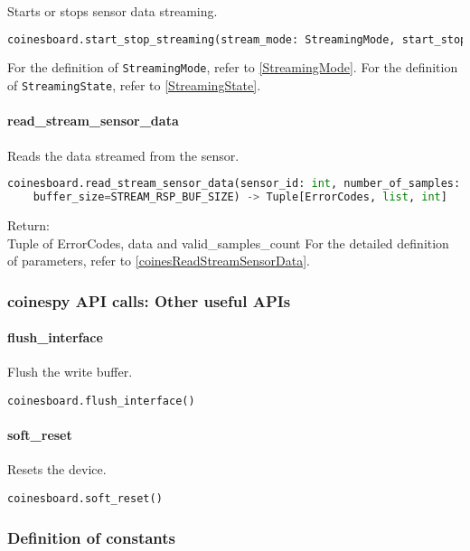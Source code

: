 Starts or stops sensor data streaming.

\begin{lstlisting}[language=python]
coinesboard.start_stop_streaming(stream_mode: StreamingMode, start_stop: StreamingState) -> ErrorCodes
\end{lstlisting}

For the definition of \texttt{StreamingMode}, refer to \ref{StreamingMode}. For the definition of \texttt{StreamingState}, refer to \ref{StreamingState}.

\paragraph{read\_stream\_sensor\_data}

Reads the data streamed from the sensor.

\begin{lstlisting}[language=python]
coinesboard.read_stream_sensor_data(sensor_id: int, number_of_samples: int,
	buffer_size=STREAM_RSP_BUF_SIZE) -> Tuple[ErrorCodes, list, int]
\end{lstlisting}

Return:\\
Tuple of ErrorCodes, data and valid\_samples\_count\newline
For the detailed definition of parameters, refer to \ref{coinesReadStreamSensorData}.

\subsubsection{coinespy API calls: Other useful APIs}

\paragraph{flush\_interface}
Flush the write buffer.

\begin{lstlisting}
coinesboard.flush_interface()
\end{lstlisting}

\paragraph{soft\_reset}
Resets the device.

\begin{lstlisting}
coinesboard.soft_reset()
\end{lstlisting}

\subsubsection{Definition of constants}

